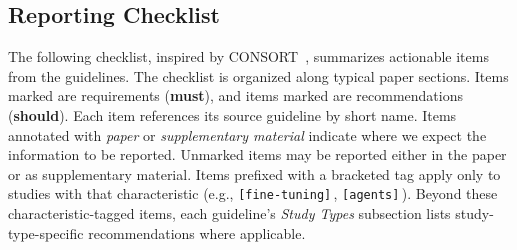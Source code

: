 \documentclass[smallextended]{svjour3}
\makeatletter
\newif\ifpaper\papertrue
\newcommand{\must}{\textbf{must}\xspace}
\newcommand{\mustnot}{\textbf{must not}\xspace}
\newcommand{\should}{\textbf{should}\xspace}
\newcommand{\paper}{\emph{paper}\xspace}
\newcommand{\supplementarymaterial}{\emph{supplementary material}\xspace}
\newcommand{\paper}{\emph{paper}\xspace}
\newcommand{\supplementarymaterial}{\emph{supplementary material}\xspace}
\newcommand{\iconM}{\usebox{\iconMbox}\xspace}
\newcommand{\iconS}{\usebox{\iconSbox}\xspace}
\newcommand{\iconM}{●\xspace}
\newcommand{\iconS}{○\xspace}
\newcommand{\condition}[1]{\texttt{\small[#1]}\,}
\newcommand{\condition}[1]{@@cond:#1@@}
\makeatother
\begin{document}
\begin{appendices}
\section{Reporting Checklist}
\label{sec:checklist}


The following checklist, inspired by CONSORT~\citep{Schulz2010}, summarizes actionable items from the guidelines.
The checklist is organized along typical paper sections.
Items marked \iconM are requirements (\must), and items marked \iconS are recommendations (\should).
Each item references its source guideline by short name.
Items annotated with \paper or \supplementarymaterial indicate where we expect the information to be reported.
Unmarked items may be reported either in the paper or as supplementary material.
Items prefixed with a bracketed tag apply only to studies with that characteristic (e.g., \condition{fine-tuning}, \condition{agents}).\ifpaper\else{} Readers can hover each tag to read its description and use the filter panel to hide items that do not apply to their study. The checklist can be shared via a link or exported as CSV, Markdown, or LaTeX. The exported checklist can be included in an appendix or in the supplementary material of a paper.\fi
Beyond these characteristic-tagged items, each guideline's \emph{Study Types} subsection lists study-type-specific recommendations where applicable.


\end{appendices}
\end{document}
